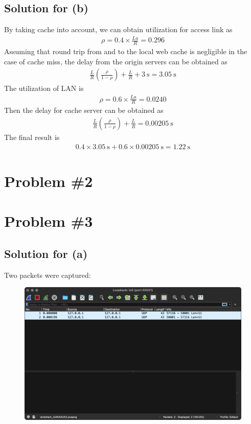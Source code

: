 \documentclass{scrartcl}
\newcommand{\un}[1]{\ensuremath{\ \mathrm{#1}}}
\begin{document}
\subsection{Solution for (b)}
By taking cache into account, we can obtain utilization for access link as
\begin{align*} 
  \rho = 0.4 \times \frac{La}{R} = 0.296
\end{align*}
Assuming that round trip from and to the local web cache is negligible in the
case of cache miss, the delay from the origin servers can be obtained as
\begin{align*}
  \frac{L}{R} \left( \frac{\rho}{1 - \rho} \right) + \frac{L}{R} + 3 \un{s}
  = 3.05 \un{s}
\end{align*}
The utilization of LAN is
\begin{align*}
  \rho = 0.6 \times \frac{La}{R} = 0.0240
\end{align*}
Then the delay for cache server can be obtained as
\begin{align*}
  \frac{L}{R} \left( \frac{\rho}{1 - \rho} \right) + \frac{L}{R}
  = 0.00205 \un{s}
\end{align*}
The final result is
\begin{align*}
  0.4 \times 3.05 \un{s} + 0.6 \times 0.00205 \un{s} = 1.22 \un{s}
\end{align*}

\section{Problem \#2}

\section{Problem \#3}

\subsection{Solution for (a)}
Two packets were captured:

\begin{figure}[H]
  \centering
  \includegraphics[width=0.8\linewidth]{prob3a}
\end{figure}
\end{document}
